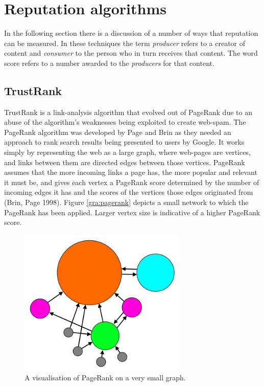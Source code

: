 \documentclass[]{final_report}
\begin{document}
\section{Reputation algorithms}

In the following section there is a discussion of a number of ways that reputation can be measured. In these techniques the term \textsl{producer} refers to a creator of content and \textsl{consumer} to the person who in turn receives that content. The word score refers to a number awarded to the \textsl{producers} for that content.


\subsection{TrustRank}

TrustRank is a link-analysis algorithm that evolved out of PageRank due to an abuse of the algorithm's weaknesses being exploited to create web-spam. The PageRank algorithm was developed by Page and Brin as they needed an approach to rank search results being presented to users by Google. It works simply by representing the web as a large graph, where web-pages are vertices, and links between them are directed edges between those vertices. PageRank assumes that the more incoming links a page has, the more popular and relevant it must be, and gives each vertex a PageRank score determined by the number of incoming edges it has and the scores of the vertices those edges originated from (Brin, Page 1998). Figure \ref{gra:pagerank} depicts a small network to which the PageRank has been applied. Larger vertex size is indicative of a higher PageRank score.

\begin{figure}[ht!]
\centering
\includegraphics[width=80mm]{chap2/pagerank.png}
\caption{A visualisation of PageRank on a very small graph.}
\end{figure}\label{gra:pagerank}
\end{document}
